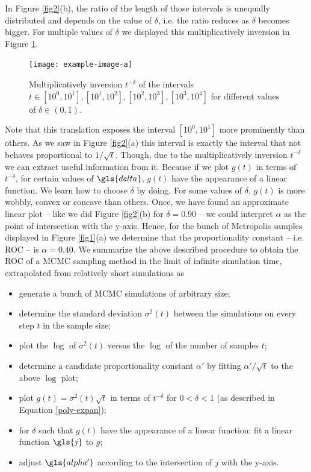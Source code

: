 \documentclass[a4paper, twoside, 11pt]{report}
\theoremstyle{plain}
\theoremstyle{definition}
\theoremstyle{remark}
\begin{document}
In Figure \ref{fig2}(b), the ratio of the length of those intervals is unequally distributed and depends on the value of $\delta$, i.e. the ratio reduces as $\delta$ becomes bigger. For multiple values of $\delta$ we displayed this multiplicatively inversion in Figure \ref{fig3}.
\begin{figure}[H]
\centering
\captionsetup{width = 0.9\textwidth}
\texttt{[image: example-image-a]}
\caption{Multiplicatively inversion $t^{-\delta}$ of the intervals $t \in [10^0,10^1], [10^1,10^2], [10^2,10^3], [10^3,10^4]$ for different values of $\delta \in (0,1)$. }
\label{fig3}
\end{figure}
Note that this translation exposes the interval $[10^0,10^1]$ more prominently than others. As we saw in Figure \ref{fig2}(a) this interval is exactly the interval that not behaves proportional to $1 / \sqrt{t}$. Though, due to the multiplicatively inversion $t^{-\delta}$ we can extract useful information from it. Because if we plot $g(t)$ in terms of $t^{-\delta}$, for certain values of $\gls{delta}$, $g(t)$ have the appearance of a linear function. We learn how to choose $\delta$ by doing. For some values of $\delta$, $g(t)$ is more wobbly, convex or concave than others. Once, we have found an approximate linear plot -- like we did Figure \ref{fig2}(b) for $\delta = 0.90$ -- we could interpret $\alpha$ as the point of intersection with the y-axis. Hence, for the bunch of Metropolis samples displayed in Figure \ref{fig1}(a) we determine that the proportionality constant -- i.e. ROC -- is $\alpha = 0.40$. We summarize the above described procedure to obtain the ROC of a MCMC sampling method in the limit of infinite simulation time, extrapolated from relatively short simulations as
\begin{itemize}
\item generate a bunch of MCMC simulations of arbitrary size;
\item determine the standard deviation ${\sigma}^2(t)$ between the simulations on every step $t$ in the sample size;
\item plot the $\log$ of ${\sigma}^2(t)$ versus the $\log$ of the number of samples $t$;
\item determine a candidate proportionality constant $\alpha'$ by fitting $\alpha' / \sqrt{t}$ to the above $\log$ plot;
\item plot $g(t) = {\sigma}^2(t) \sqrt{t}$ in terms of $t^{-\delta}$ for $0 < \delta < 1$ (as described in Equation \ref{poly-expan});
\item for $\delta$ such that $g(t)$ have the appearance of a linear function: fit a linear function $\gls{j}$ to $g$;
\item adjust $\gls{alpha'}$ according to the intersection of $j$ with the y-axis.
\end{itemize}
\end{document}
